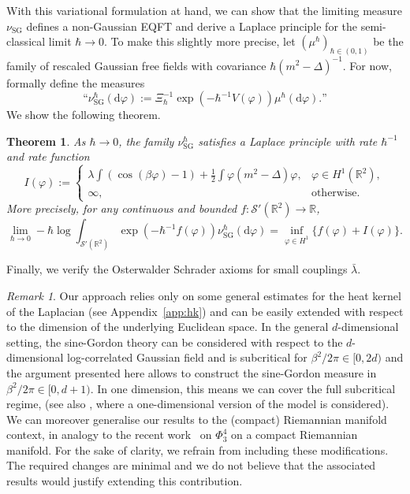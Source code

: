 \documentclass[11pt, a4paper]{scrartcl}
\numberwithin{equation}{section}
\theoremstyle{plain}
\newtheorem{theorem}[foo]{Theorem}
\theoremstyle{remark}
\newtheorem{remark}[foo]{Remark}
\newcommand{\assign}{:=}
\newcommand{\mathd}{\mathrm{d}}
\newcommand{\tmop}[1]{\ensuremath{\operatorname{#1}}}
\begin{document}
With this variational formulation at hand, we can show that the
limiting measure $\nu_{\tmop{SG}}$ defines a non-Gaussian EQFT and derive a
Laplace principle for the semi-classical limit $\hbar \rightarrow 0$. To make
this slightly more precise, let $(\mu^{\hbar})_{\hbar \in (0, 1)}$ be the
family of rescaled Gaussian free fields with covariance $\hbar (m^2 -
\Delta)^{- 1}$. For now, formally define the measures
\[ \text{``} \nu_{\tmop{SG}}^{\hbar} (\mathd \varphi) \assign \Xi_{\hbar}^{-
   1} \exp (- \hbar^{- 1} V (\varphi)) \mu^{\hbar} (\mathd \varphi) \text{.''}
\]
We show the following theorem.

\begin{theorem}
  \label{thm:LDP}As $\hbar \rightarrow 0$, the family
  $\nu^{\hbar}_{\tmop{SG}}$ satisfies a Laplace principle with rate $\hbar^{-
  1}$ and rate function
  \begin{equation}
    I (\varphi) \assign \begin{cases}
      \lambda \int (\cos (\beta \varphi) - 1) + \frac{1}{2} \int \varphi (m^2
      - \Delta) \varphi, & \varphi \in H^1 (\mathbb{R}^2),\\
      \infty, & \text{otherwise} .
    \end{cases} \label{eq:def-rf}
  \end{equation}
  More precisely, for any continuous and bounded $f : \mathcal{S} '
  (\mathbb{R}^2) \rightarrow \mathbb{R}$,
  \begin{equation}
    \lim_{\hbar \rightarrow 0} - \hbar \log \int_{\mathcal{S}' (\mathbb{R}^2)}
    \exp (- \hbar^{- 1} f (\varphi)) \nu_{\tmop{SG}}^{\hbar} (\mathd \varphi)
    = \inf_{\varphi \in H^1} \{ f (\varphi) + I (\varphi) \} . \label{eq:LDP}
  \end{equation}
\end{theorem}

Finally, we verify the
Osterwalder Schrader axioms for small couplings $\bar{\lambda}$.

\begin{remark}
  Our approach relies only on some general estimates for the heat kernel of
  the Laplacian (see Appendix~\ref{app:hk}) and can be easily extended with
  respect to the dimension of the underlying Euclidean space. In the general
  $d$-dimensional setting, the sine-Gordon theory can be considered with respect to the $d$-dimensional log-correlated Gaussian field and is subcritical for $\beta^2 / 2 \pi \in
  [0, 2 d)$ and the argument presented here allows to construct the
  sine-Gordon measure in $\beta^2 / 2 \pi \in [0, d + 1)$. In one dimension, this means we can cover the full subcritical
  regime, (see also 
  {\cite{lacoinProbabilisticApproachUltraviolet2022}}, where a one-dimensional version of the model is considered). We can moreover generalise our results to the
  (compact) Riemannian manifold context, in analogy to the recent
  work~{\cite{bailleulPhi4_3MeasuresCompact2023}} on $\Phi^4_3$ on a compact
  Riemannian manifold. For the sake of clarity, we refrain from including
  these modifications. The required changes are minimal and we do not believe
  that the associated results would justify extending this contribution.
\end{remark}
\end{document}
